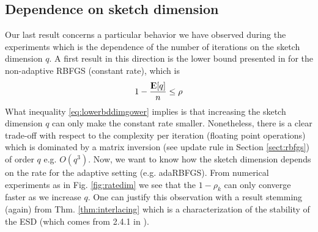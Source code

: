 \documentclass[12pt,conference,compsocconf]{IEEEtran}
\newcommand{\E}{{\rm I\kern-.3em E}}
\begin{document}
\subsection{Dependence on sketch dimension}\label{sect:sketchdim}
Our last result concerns a particular behavior we have observed during the experiments which is the dependence of the number of iterations on the sketch dimension $q$. A first result in this direction is the lower bound presented in \cite{Gower1} for the non-adaptive RBFGS (constant rate), which is 
\begin{align} \label{eq:lowerbddimgower}
	1-\frac{\E[q]}{n}\leq \rho 
\end{align}
What inequality \eqref{eq:lowerbddimgower} implies is that increasing the sketch dimension $q$ can only make the constant rate smaller. Nonetheless, there is a clear trade-off with respect to the complexity per iteration (floating point operations) which is dominated by a matrix inversion (see update rule in Section \ref{sect:rbfgs}) of order $q$ e.g. $O(q^{3})$. Now, we want to know how the sketch dimension depends on the rate for the adaptive setting (e.g. adaRBFGS). From numerical experiments as in Fig. \ref{fig:ratedim} we see that the $1-\rho_k$ can only converge faster as we increase $q$. One can justify this observation with a result stemming (again) from Thm. \ref{thm:interlacing} which is a characterization of the stability of the ESD (which comes from 2.4.1 in \cite{Tao}).
\end{document}
